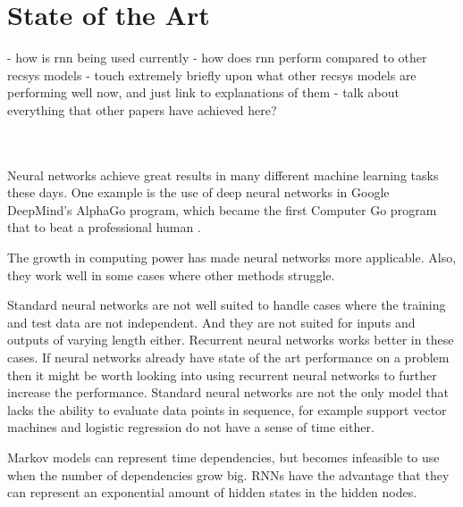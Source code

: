 \chapter{State of the Art}

- how is rnn being used currently
- how does rnn perform compared to other recsys models
- touch extremely briefly upon what other recsys models are performing well now, and just link to explanations of them
- talk about everything that other papers have achieved here?



\\
\\

Neural networks achieve great results in many different machine learning tasks these days. One example is the use of deep neural networks in Google DeepMind's AlphaGo program, which became the first Computer Go program that to beat a professional human \cite{BBC:go-champion}.

The growth in computing power has made neural networks more applicable. Also, they work well in some cases where other methods struggle.

Standard neural networks are not well suited to handle cases where the training and test data are not independent. And they are not suited for inputs and outputs of varying length either. Recurrent neural networks works better in these cases. If neural networks already have state of the art performance on a problem then it might be worth looking into using recurrent neural networks to further increase the performance. Standard neural networks are not the only model that lacks the ability to evaluate data points in sequence, for example support vector machines and logistic regression do not have a sense of time either.

Markov models can represent time dependencies, but becomes infeasible to use when the number of dependencies grow big. RNNs have the advantage that they can represent an exponential amount of hidden states in the hidden nodes.\\

